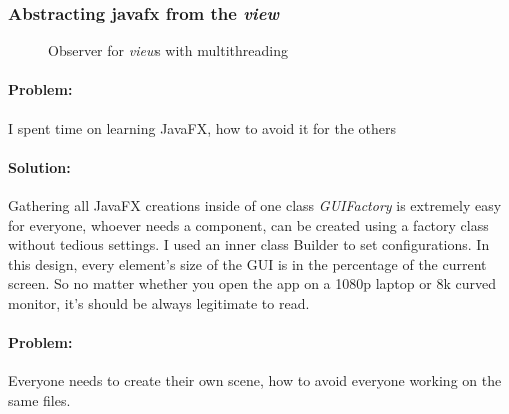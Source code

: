 \documentclass[a4paper,12pt]{report}
\begin{document}
\subsubsection*{Abstracting javafx from the \textit{view}}
\begin{figure}[H]
	\centering{}
	\caption{Observer for \textit{view}s with multithreading}
	\label{img:Observer}
	\end{figure}

	\paragraph{Problem:} I spent time on learning JavaFX, how to avoid it for the others

	\paragraph*{Solution:} Gathering all JavaFX creations inside of one class \textit{GUIFactory} is extremely easy for everyone, whoever needs a component, can be created using a factory class without tedious settings. I used an inner class Builder to set configurations. In this design, every element's size of the GUI is in the percentage of the current screen. So no matter whether you open the app on a 1080p laptop or 8k curved monitor, it's should be always legitimate to read.


	\paragraph{Problem:} Everyone needs to create their own scene, how to avoid everyone working on the same files.
\end{document}
